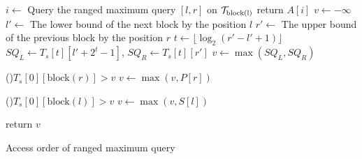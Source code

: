 \begin{algorithm}
\SetAlgoNoLine
{}

 {
  $i \gets$ Query the ranged maximum query $[l, r]$ on ${\cal T}_\text{block(l)}$ \;
  return $A[i]$ \;
}
$v \gets - \infty$ \;
$l' \gets$ The lower bound of the next block by the position $l$ \;
$r' \gets$ The upper bound of the previous block by the position $r$ \;
 {
  $t \gets \lfloor \log_2 (r'-l'+1) \rfloor$ \;
  $SQ_L \gets T_s[t][l' + 2^t - 1]$, $SQ_R \gets T_s[t][r']$ \;
  $v \gets \max(SQ_L, SQ_R)$ \;
}

\If(){$T_s[0][\text{block}(r)] > v$} {
  $v \gets \max(v, P[r])$ \;
}

\If(){$T_s[0][\text{block}(l)] > v$} {
  $v \gets \max(v, S[l])$ \;
}

return $v$ \;

\caption{Access order of ranged maximum query}
\label{alg:rmq-access-order-2e}
\end{algorithm}
